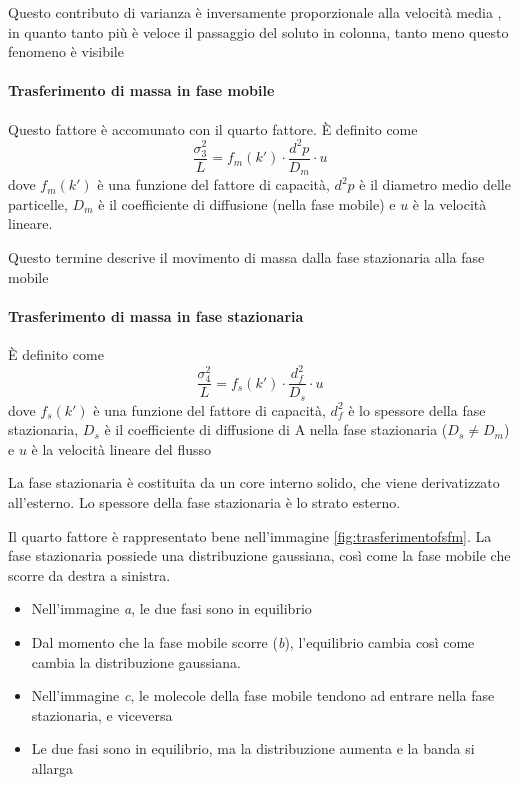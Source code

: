 Questo contributo di varianza è inversamente proporzionale alla velocità media , in quanto tanto più è veloce il passaggio del soluto in colonna, tanto meno questo fenomeno è visibile

\paragraph{Trasferimento di massa in fase mobile}

Questo fattore è accomunato con il quarto fattore. È definito come
\[
\frac{\sigma^2_3}{L} = f_m (k') \cdot \frac{d^2 p}{D_m} \cdot u
\]
dove $f_m (k')$ è una funzione del fattore di capacità, $d^2 p$ è il diametro medio delle particelle, $D_m$ è il coefficiente di diffusione (nella fase mobile) e $u$ è la velocità lineare.

Questo termine descrive il movimento di massa dalla fase stazionaria alla fase mobile


\paragraph{Trasferimento di massa in fase stazionaria}

È definito come
\[
\frac{\sigma^2_4}{L} = f_s (k') \cdot \frac{d_f^2}{D_s} \cdot u
\]
dove $f_s (k')$ è una funzione del fattore di capacità, $d_f^2$ è lo spessore della fase stazionaria, $D_s$ è il coefficiente di diffusione di A nella fase stazionaria ($D_s \neq D_m$) e $u$ è la velocità lineare del flusso

La fase stazionaria è costituita da un core interno solido, che viene derivatizzato all'esterno. Lo spessore della fase stazionaria è lo strato esterno.


Il quarto fattore è rappresentato bene nell'immagine \ref{fig:trasferimentofsfm}. La fase stazionaria possiede una distribuzione gaussiana, così come la fase mobile che scorre da destra a sinistra.
\begin{itemize}
\item Nell'immagine \textit{a}, le due fasi sono in equilibrio
\item Dal momento che la fase mobile scorre (\textit{b}), l'equilibrio cambia così come cambia la distribuzione gaussiana.
\item Nell'immagine \textit{c}, le molecole della fase mobile tendono ad entrare nella fase stazionaria, e viceversa
\item Le due fasi sono in equilibrio, ma la distribuzione aumenta e la banda si allarga
\end{itemize}

